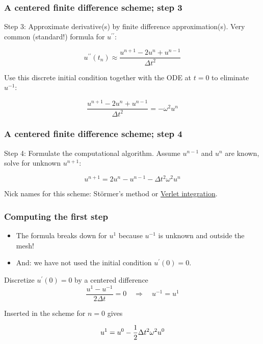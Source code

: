 \documentclass{beamer}
\begin{document}
\begin{frame}
\frametitle{A centered finite difference scheme; step 3}

Step 3: Approximate derivative(s) by finite
difference approximation(s).
Very common (standard!) formula for $u^{\prime\prime}$:

\[
u^{\prime\prime}(t_n) \approx \frac{u^{n+1}-2u^n + u^{n-1}}{\Delta t^2}
\]

Use this discrete initial condition together with the ODE at $t=0$ to
eliminate $u^{-1}$:

\[
\frac{u^{n+1}-2u^n + u^{n-1}}{\Delta t^2} = -\omega^2 u^n
\]
\end{frame}

\begin{frame}
\frametitle{A centered finite difference scheme; step 4}

Step 4: Formulate the computational algorithm.
Assume $u^{n-1}$ and $u^n$ are known, solve for unknown $u^{n+1}$:

\[
u^{n+1} = 2u^n - u^{n-1} - \Delta t^2\omega^2 u^n
\]

Nick names for this scheme:
St\"{o}rmer's
method or \href{{http://en.wikipedia.org/wiki/Velocity_Verlet}}{Verlet integration}.
\end{frame}

\begin{frame}
\frametitle{Computing the first step}

\begin{itemize}
  \item The formula breaks down for $u^1$ because $u^{-1}$ is unknown and
    outside the mesh!

  \item And: we have not used the initial condition $u^{\prime}(0)=0$.
\end{itemize}

\noindent
Discretize $u^{\prime}(0)=0$ by a centered difference
\[
\frac{u^1-u^{-1}}{2\Delta t} = 0\quad\Rightarrow\quad u^{-1} = u^1
\]

Inserted in the scheme for $n=0$ gives

\[
u^1 = u^0 - \half \Delta t^2 \omega^2 u^0
\]
\end{frame}
\end{document}
